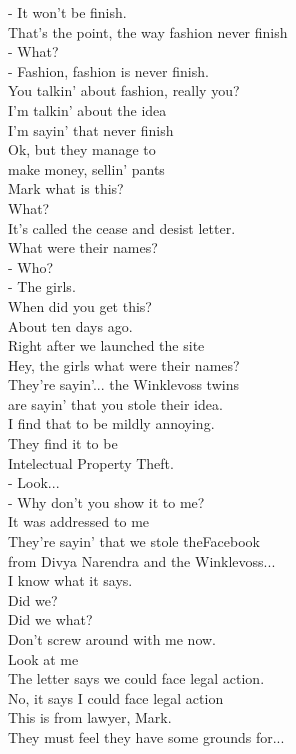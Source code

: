 \documentclass{article}
\begin{document}
\begin{multicols}{3}
- It won't be finish.\\
That's the point, the way fashion never finish\\
- What?\\
- Fashion, fashion is never finish.\\
You talkin' about fashion, really you?\\
I'm talkin' about the idea\\
I'm sayin' that never finish\\
Ok, but they manage to\\
make money, sellin' pants\\
Mark what is this?\\
What?\\
It's called the cease and desist letter.\\
What were their names?\\
- Who?\\
- The girls.\\
When did you get this?\\
About ten days ago.\\
Right after we launched the site\\
Hey, the girls what were their names?\\
They're sayin'... the Winklevoss twins\\
are sayin' that you stole their idea.\\
I find that to be mildly annoying.\\
They find it to be\\
Intelectual Property Theft.\\
- Look...\\
- Why don't you show it to me?\\
It was addressed to me\\
They're sayin' that we stole theFacebook\\
from Divya Narendra and the Winklevoss...\\
I know what it says.\\
Did we?\\
Did we what?\\
Don't screw around with me now.\\
Look at me\\
The letter says we could face legal action.\\
No, it says I could face legal action\\
This is from lawyer, Mark.\\
They must feel they have some grounds for...\\

\end{multicols}
\end{document}
